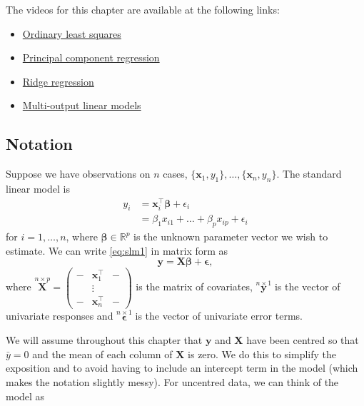 \documentclass[
]{book}
\providecommand{\tightlist}{%
  \setlength{\itemsep}{0pt}\setlength{\parskip}{0pt}}
\theoremstyle{definition}
\theoremstyle{definition}
\theoremstyle{definition}
\theoremstyle{definition}
\theoremstyle{remark}
\begin{document}
The videos for this chapter are available at the following links:

\begin{itemize}
\tightlist
\item
  \href{https://mediaspace.nottingham.ac.uk/media/Linear+ModelsA+Ordinary+Least+Squares/1_ytvk0uc6}{Ordinary least squares}
\item
  \href{https://mediaspace.nottingham.ac.uk/media/Linear+ModelsA+Principal+Component+Regression/1_h0l11uvw}{Principal component regression}
\item
  \href{https://mediaspace.nottingham.ac.uk/media/Linear+ModelsA+Ridge+Regression/1_rjnxkukd}{Ridge regression}
\item
  \href{https://mediaspace.nottingham.ac.uk/media/Linear+modelsA+multi-output+models/1_f61kjm7u}{Multi-output linear models}
\end{itemize}

\subsection*{Notation}\label{notation-3}

Suppose we have observations on \(n\) cases, \(\{\mathbf x_1, y_1\}, \ldots, \{\mathbf x_n, y_n\}\). The standard linear model is
\begin{align}
y_i &= \mathbf x_i^\top \boldsymbol \beta+\epsilon_i
\label{eq:slm1}\\
&=\beta_1 x_{i1}+\ldots+\beta_p x_{ip}+\epsilon_i
\end{align}
for \(i=1, \ldots , n\),
where \(\boldsymbol \beta\in \mathbb{R}^p\) is the unknown parameter vector we wish to estimate. We can write \eqref{eq:slm1} in matrix form as
\begin{equation}
\mathbf y=\mathbf X\boldsymbol \beta+{\pmb \epsilon},
\label{eq:slm2}
\end{equation}
where \(\stackrel{n \times p}{\mathbf X}= \begin{pmatrix} - & \mathbf x_1^\top &-\\
&\vdots&\\
-&\mathbf x_n^\top&-\end{pmatrix}\) is the matrix of covariates,
\(\stackrel{n \times 1}{\mathbf y}\) is the vector of univariate responses and \(\stackrel{n \times 1}{\pmb \epsilon}\) is the vector of univariate error terms.

We will assume throughout this chapter that \(\mathbf y\) and \(\mathbf X\) have been centred so that \(\bar{y}=0\) and the mean of each column of \(\mathbf X\) is zero. We do this to simplify the exposition and to avoid having to include an intercept term in the model (which makes the notation slightly messy). For uncentred data, we can think of the model as
\end{document}
